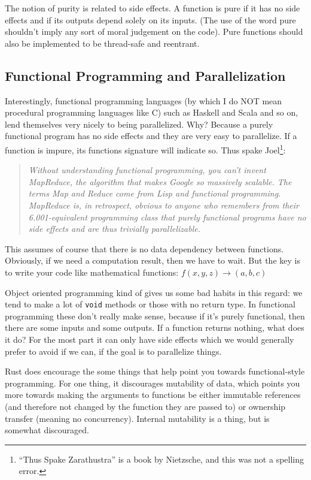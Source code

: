 The notion of purity is related to side effects. A function is pure if it has no side effects and if its outputs depend solely on its inputs. (The use of the word pure shouldn't imply any sort of moral judgement on the code). Pure functions should also be implemented to be thread-safe and reentrant.


\subsection*{Functional Programming and Parallelization}
Interestingly, functional programming languages (by which I do NOT mean procedural programming languages like C) such as Haskell and Scala and so on, lend themselves very nicely to being parallelized. Why? Because a purely functional program has no side effects and they are very easy to parallelize. If a function is impure, its functions signature will indicate so. Thus spake Joel\footnote{``Thus Spake Zarathustra'' is a book by Nietzsche, and this was not a spelling error.}:

\begin{quote}
\textit{Without understanding functional programming, you can't invent MapReduce, the algorithm that makes Google so massively scalable. The terms Map and Reduce come from Lisp and functional programming. MapReduce is, in retrospect, obvious to anyone who remembers from their 6.001-equivalent programming class that purely functional programs have no side effects and are thus trivially parallelizable.}~\cite{joel:functional}
\end{quote}

This assumes of course that there is no data dependency between functions. Obviously, if we need a computation result, then we have to wait.  But the key is to write your code like mathematical functions: $f(x, y, z) \rightarrow (a, b, c)$

Object oriented programming kind of gives us some bad habits in this regard: we tend to make a lot of \texttt{void} methods or those with no return type. In functional programming these don't really make sense, because if it's purely functional, then there are some inputs and some outputs. If a function returns nothing, what does it do? For the most part it can only have side effects which we would generally prefer to avoid if we can, if the goal is to parallelize things.

Rust does encourage the some things that help point you towards functional-style programming. For one thing, it discourages mutability of data, which points you more towards making the arguments to functions be either immutable references (and therefore not changed by the function they are passed to) or ownership transfer (meaning no concurrency). Internal mutability is a thing, but is somewhat discouraged.




